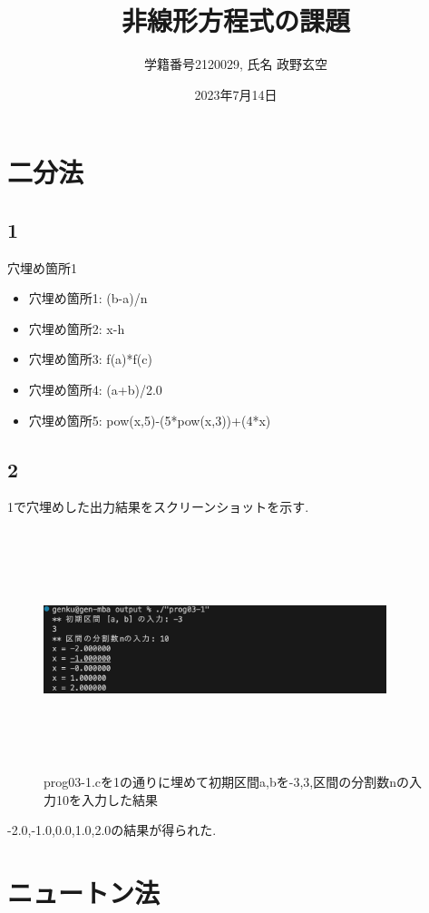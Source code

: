 \documentclass[a4j,10pt,dvipdfmx]{jarticle}
\begin{document}
\title{非線形方程式の課題}
\author{学籍番号2120029, 氏名 政野玄空}
\date{2023年7月14日}
\maketitle
\section{二分法}
\subsection{1}
穴埋め箇所1
\begin{itemize}
  \item 穴埋め箇所1: (b-a)/n
  \item 穴埋め箇所2: x-h
  \item 穴埋め箇所3: f(a)*f(c)
  \item 穴埋め箇所4: (a+b)/2.0
  \item 穴埋め箇所5:  pow(x,5)-(5*pow(x,3))+(4*x)
\end{itemize}
\subsection{2}
1で穴埋めした出力結果をスクリーンショットを示す.
\begin{figure}[H]
  \begin{center}
  \includegraphics[height=7cm,width=10cm]{screen714.png}
  \caption{prog03-1.cを1の通りに埋めて初期区間a,bを-3,3,区間の分割数nの入力10を入力した結果}
\end{center}
\end{figure}
-2.0,-1.0,0.0,1.0,2.0の結果が得られた.
\section{ニュートン法}
\end{document}
